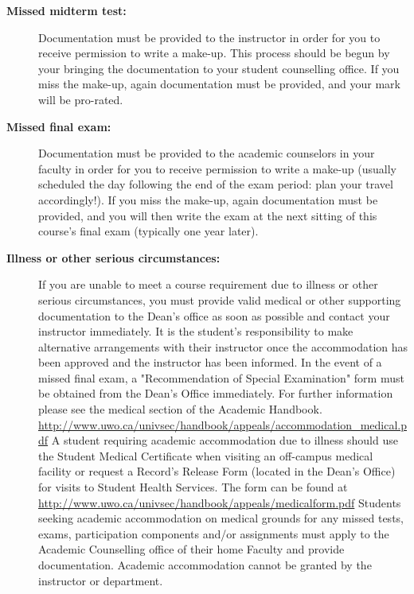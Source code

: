 \documentclass[12pt]{article}
\begin{document}
\begin{description}
\item[\bf Missed midterm test:] Documentation must be provided to the instructor in order for you to receive permission to write a make-up. This process should be begun by your bringing the documentation to your student counselling office. If you miss the make-up, again documentation must be provided, and your mark will be pro-rated.

\item[\bf Missed final exam:] Documentation must be provided to the academic counselors in your faculty in order for you to receive permission to write a make-up (usually scheduled the day following the end of the exam period: plan your travel accordingly!). If you miss the make-up, again documentation must be provided, and you will then write the exam at the next sitting of this course's final exam (typically one year later).

\item[\bf Illness or other serious circumstances:] If you are unable to meet a course requirement due to illness or other serious circumstances, you must provide valid medical or other supporting documentation to the Dean's office as soon as possible and contact your instructor immediately. It is the student's responsibility to make alternative arrangements with their instructor once the accommodation has been approved and the instructor has been informed. In the event of a missed final exam, a "Recommendation of Special Examination" form must be obtained from the Dean's Office immediately. For further information please see the medical section of the Academic Handbook.
\url{http://www.uwo.ca/univsec/handbook/appeals/accommodation_medical.pdf}
A student requiring academic accommodation due to illness should use the Student Medical Certificate when visiting an off-campus medical facility or request a Record's Release Form (located in the Dean's Office) for visits to Student Health Services. The form can be found at \url{http://www.uwo.ca/univsec/handbook/appeals/medicalform.pdf}
Students seeking academic accommodation on medical grounds for any missed tests, exams, participation components and/or assignments must apply to the Academic Counselling office of their home Faculty and provide documentation. Academic accommodation cannot be granted by the instructor or department.


\end{description}
\end{document}
